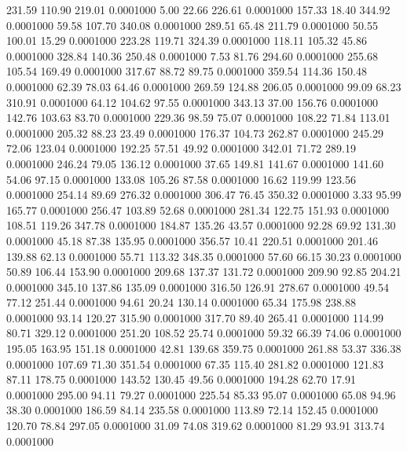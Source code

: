  231.59  110.90  219.01   0.0001000
   5.00   22.66  226.61   0.0001000
 157.33   18.40  344.92   0.0001000
  59.58  107.70  340.08   0.0001000
 289.51   65.48  211.79   0.0001000
  50.55  100.01   15.29   0.0001000
 223.28  119.71  324.39   0.0001000
 118.11  105.32   45.86   0.0001000
 328.84  140.36  250.48   0.0001000
   7.53   81.76  294.60   0.0001000
 255.68  105.54  169.49   0.0001000
 317.67   88.72   89.75   0.0001000
 359.54  114.36  150.48   0.0001000
  62.39   78.03   64.46   0.0001000
 269.59  124.88  206.05   0.0001000
  99.09   68.23  310.91   0.0001000
  64.12  104.62   97.55   0.0001000
 343.13   37.00  156.76   0.0001000
 142.76  103.63   83.70   0.0001000
 229.36   98.59   75.07   0.0001000
 108.22   71.84  113.01   0.0001000
 205.32   88.23   23.49   0.0001000
 176.37  104.73  262.87   0.0001000
 245.29   72.06  123.04   0.0001000
 192.25   57.51   49.92   0.0001000
 342.01   71.72  289.19   0.0001000
 246.24   79.05  136.12   0.0001000
  37.65  149.81  141.67   0.0001000
 141.60   54.06   97.15   0.0001000
 133.08  105.26   87.58   0.0001000
  16.62  119.99  123.56   0.0001000
 254.14   89.69  276.32   0.0001000
 306.47   76.45  350.32   0.0001000
   3.33   95.99  165.77   0.0001000
 256.47  103.89   52.68   0.0001000
 281.34  122.75  151.93   0.0001000
 108.51  119.26  347.78   0.0001000
 184.87  135.26   43.57   0.0001000
  92.28   69.92  131.30   0.0001000
  45.18   87.38  135.95   0.0001000
 356.57   10.41  220.51   0.0001000
 201.46  139.88   62.13   0.0001000
  55.71  113.32  348.35   0.0001000
  57.60   66.15   30.23   0.0001000
  50.89  106.44  153.90   0.0001000
 209.68  137.37  131.72   0.0001000
 209.90   92.85  204.21   0.0001000
 345.10  137.86  135.09   0.0001000
 316.50  126.91  278.67   0.0001000
  49.54   77.12  251.44   0.0001000
  94.61   20.24  130.14   0.0001000
  65.34  175.98  238.88   0.0001000
  93.14  120.27  315.90   0.0001000
 317.70   89.40  265.41   0.0001000
 114.99   80.71  329.12   0.0001000
 251.20  108.52   25.74   0.0001000
  59.32   66.39   74.06   0.0001000
 195.05  163.95  151.18   0.0001000
  42.81  139.68  359.75   0.0001000
 261.88   53.37  336.38   0.0001000
 107.69   71.30  351.54   0.0001000
  67.35  115.40  281.82   0.0001000
 121.83   87.11  178.75   0.0001000
 143.52  130.45   49.56   0.0001000
 194.28   62.70   17.91   0.0001000
 295.00   94.11   79.27   0.0001000
 225.54   85.33   95.07   0.0001000
  65.08   94.96   38.30   0.0001000
 186.59   84.14  235.58   0.0001000
 113.89   72.14  152.45   0.0001000
 120.70   78.84  297.05   0.0001000
  31.09   74.08  319.62   0.0001000
  81.29   93.91  313.74   0.0001000
